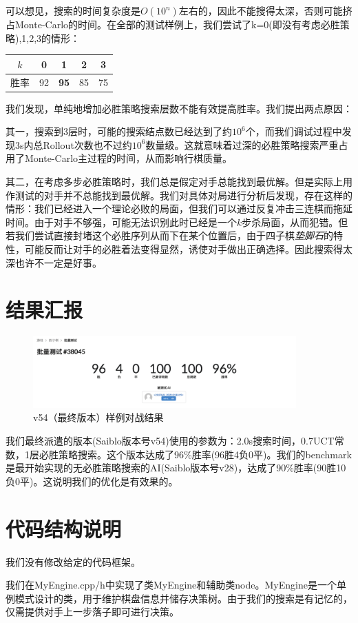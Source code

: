 \documentclass{article}
\begin{document}
	可以想见，搜索的时间复杂度是$O(10^n)$左右的，因此不能搜得太深，否则可能挤占Monte-Carlo的时间。在全部的测试样例上，我们尝试了k=0(即没有考虑必胜策略),1,2,3的情形：
	
	\begin{table}[h]
		\centering
		\begin{tabular}{||c|c|c|c|c||}
			\hline $k$&0&1&2&3 \\
			\hline 胜率&92&\textbf{95}&85&75\\
			\hline
		\end{tabular}
	\end{table}

	我们发现，单纯地增加必胜策略搜索层数不能有效提高胜率。我们提出两点原因：
	
	其一，搜索到3层时，可能的搜索结点数已经达到了约$10^6$个，而我们调试过程中发现3s内总Rollout次数也不过约$10^6$数量级。这就意味着过深的必胜策略搜索严重占用了Monte-Carlo主过程的时间，从而影响行棋质量。
	
	其二，在考虑多步必胜策略时，我们总是假定对手总能找到最优解。但是实际上用作测试的对手并不总能找到最优解。我们对具体对局进行分析后发现，存在这样的情形：我们已经进入一个理论必败的局面，但我们可以通过反复冲击三连棋而拖延时间。由于对手不够强，可能无法识别此时已经是一个$k$步杀局面，从而犯错。但若我们尝试直接封堵这个必胜序列从而下在某个位置后，由于四子棋\textit{垫脚石}的特性，可能反而让对手的必胜着法变得显然，诱使对手做出正确选择。因此搜索得太深也许不一定是好事。
	
	\section{结果汇报}
	
	\begin{figure}[ht]
		\centering
		\includegraphics[width=0.9\textwidth]{result}
		\caption{v54（最终版本）样例对战结果}
	\end{figure}
	
	我们最终派遣的版本(Saiblo版本号v54)使用的参数为：2.0s搜索时间，0.7UCT常数，1层必胜策略搜索。这个版本达成了96\%胜率(96胜4负0平)。我们的benchmark是最开始实现的无必胜策略搜索的AI(Saiblo版本号v28)，达成了90\%胜率(90胜10负0平)。这说明我们的优化是有效果的。
	
	\section{代码结构说明}
	
	我们没有修改给定的代码框架。
	
	我们在MyEngine.cpp/h中实现了类MyEngine和辅助类node。MyEngine是一个单例模式设计的类，用于维护棋盘信息并储存决策树。由于我们的搜索是有记忆的，仅需提供对手上一步落子即可进行决策。
\end{document}
